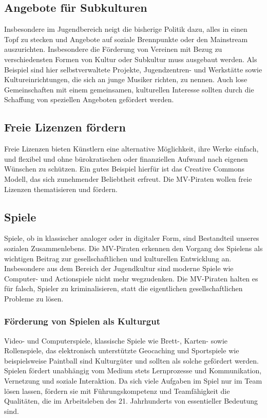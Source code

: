 \subsection{Angebote für Subkulturen}

Insbesondere im Jugendbereich neigt die bisherige Politik dazu, alles in einen Topf zu stecken und Angebote auf soziale Brennpunkte oder den Mainstream auszurichten. Insbesondere die Förderung von Vereinen mit Bezug zu verschiedensten Formen von Kultur oder Subkultur muss ausgebaut werden. Als Beispiel sind hier selbstverwaltete Projekte, Jugendzentren- und Werkstätte sowie Kultureinrichtungen, die sich an junge Musiker richten, zu nennen. Auch lose Gemeinschaften mit einem gemeinsamen, kulturellen Interesse sollten durch die Schaffung von speziellen Angeboten gefördert werden.

\subsection{Freie Lizenzen fördern}

Freie Lizenzen bieten Künstlern eine alternative Möglichkeit, ihre Werke einfach, und flexibel und ohne bürokratischen oder finanziellen Aufwand nach eigenen Wünschen zu schützen. Ein gutes Beispiel hierfür ist das Creative Commons Modell, das sich zunehmender Beliebtheit erfreut. Die MV-Piraten wollen freie Lizenzen thematisieren und fördern.

\subsection{Spiele}

Spiele, ob in klassischer analoger oder in digitaler Form, sind Bestandteil unseres sozialen Zusammenlebens. Die MV-Piraten erkennen den Vorgang des Spielens als wichtigen Beitrag zur gesellschaftlichen und kulturellen Entwicklung an. Insbesondere aus dem Bereich der Jugendkultur sind moderne Spiele wie Computer- und Actionspiele nicht mehr wegzudenken. Die MV-Piraten halten es für falsch, Spieler zu kriminalisieren, statt die eigentlichen gesellschaftlichen Probleme zu lösen.

\subsubsection{Förderung von Spielen als Kulturgut}

Video- und Computerspiele, klassische Spiele wie Brett-, Karten- sowie Rollenspiele, das elektronisch unterstützte Geocaching und Sportspiele wie beispielsweise Paintball sind Kulturgüter und sollten als solche gefördert werden. Spielen fördert unabhängig vom Medium stets Lernprozesse und Kommunikation, Vernetzung und soziale Interaktion. Da sich viele Aufgaben im Spiel nur im Team lösen lassen, fördern sie mit Führungskompetenz und Teamfähigkeit die Qualitäten, die im Arbeitsleben des 21. Jahrhunderts von essentieller Bedeutung sind.

